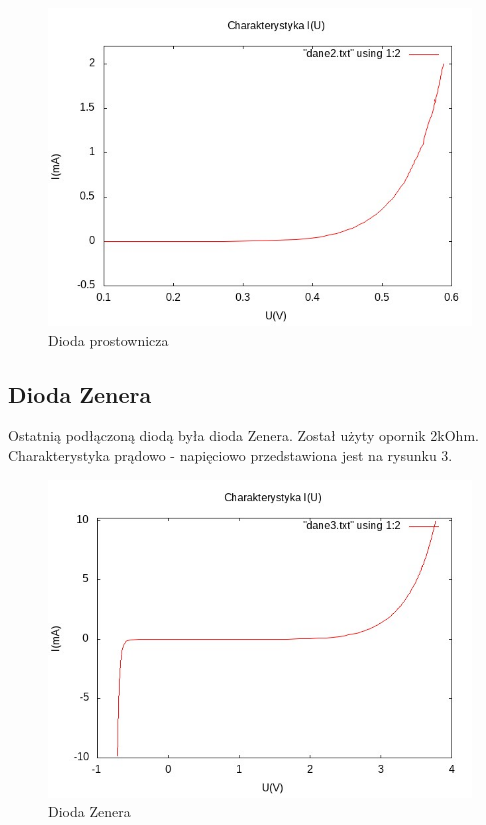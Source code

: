 \documentclass[a4paper,11pt]{article}
\begin{document}
\begin{figure}[ht]
 \begin{center}
  \includegraphics[width=12cm]{wykres2}
 \end{center}
 \caption{Dioda prostownicza}
\end{figure}

\subsection{Dioda Zenera}

Ostatnią podłączoną diodą była dioda Zenera. Został użyty opornik 2kOhm. Charakterystyka prądowo - napięciowo przedstawiona jest na rysunku 3.

\begin{figure}[ht]
 \begin{center}
  \includegraphics[width=12cm]{wykres3}
 \end{center}
 \caption{Dioda Zenera}
\end{figure}
\end{document}
